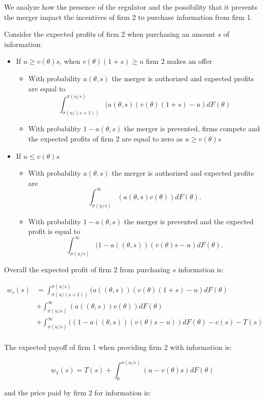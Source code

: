 \documentclass[a4paper,leqno]{article}%
\renewcommand{\t}{\theta}
\newcommand{\s}{\sigma}
\begin{document}
We analyze how the presence of the regulator and the possibility that it prevents the merger impact the incentives of firm 2 to purchase information from firm 1.


Consider the expected profits of firm 2 when purchasing an amount $s$ of information:

\begin{itemize}
    \item If $u\geq v(\t)s$, when $v(\t)(1+s)\geq u$ firm 2 makes an offer
    \begin{itemize}
        \item With probability $a(\t,s)$ the merger is authorized and expected profits are equal to $$\int_{\s(u/(s+1))}^{\s(u/s)}(a(\t,s)(v(\t)(1+s)-u)dF(\t)$$
        \item With probability $1-a(\t,s)$ the merger is prevented, firms compete and the expected profits of firm 2 are equal to zero as $u\geq v(\t)s$
    \end{itemize}
    \item If $u\leq v(\t)s$
    \begin{itemize}
        \item With probability $a(\t,s)$ the merger is authorized and expected profits are
        $$\int_{\s(u/s)}^{\infty}(a(\t,s)v(\t))dF(\t).$$
        \item With probability $1-a(\t,s)$ the merger is prevented and the expected profit is equal to $$\int_{\s(u/s)}^\infty (1-a((\t,s))(v(\t)s-u)dF(\t).$$
    \end{itemize} 
\end{itemize}

Overall the expected profit of firm 2 from purchasing $s$ information is:

\begin{equation}
    \begin{aligned}
w_r(s)&=\int_{\s(u/(s+1))}^{\s(u/s)}(a((\t,s))(v(\t)(1+s)-u)dF(\t)\\ 
    &+\int_{\s(u/s)}^{\infty}(a((\t,s))v(\t))dF(\t)\\
    &+\int_{\s(u/s)}^\infty ((1-a((\t,s))(v(\t)s-u))dF(\t)-c(s)-T(s)\\
\end{aligned}
\end{equation}


The expected payoff of firm 1 when providing firm 2 with information is:

$$w_1(s)=T(s)+\int_{0}^{\s(u/s)}(u-v(\t)s)dF(\t)$$

and the price paid by firm 2 for information is:
\end{document}
